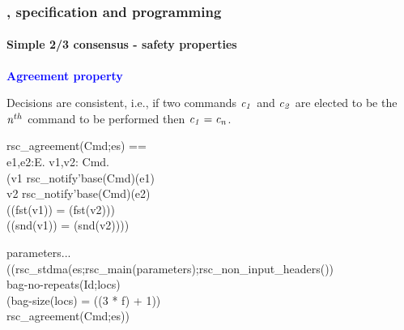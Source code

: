 \documentclass[12pt,red]{beamer}
\newcommand{\cemph}[1]{\textcolor{blue}{\textbf{#1}}}
\begin{document}
\begin{frame}[fragile]
  \frametitle{\eml, specification and programming}

  \framesubtitle{Simple 2/3 consensus - safety properties}

  \cemph{Agreement property}

  \vspace{0.1in}

  Decisions are consistent, i.e., if two commands $\mathit{c_1}$ and
  $\mathit{c_2}$ are elected to be the $\mathit{n}^{th}$ command to be
  performed then $\mathit{c_1}=\mathit{c_n}$.

  \begin{scriptsize}
    \begin{program*}
      \>rsc\_agreement(Cmd;es) ==\\
      \>  \mforall{}e1,e2:E. \mforall{}v1,v2:\mBbbZ{} \mtimes{} Cmd.\\
      \>    (v1 \mmember{} rsc\_notify'base(Cmd)(e1)\\
      \>    {}\mRightarrow{} v2 \mmember{} rsc\_notify'base(Cmd)(e2)\\
      \>    {}\mRightarrow{} ((fst(v1)) = (fst(v2)))\\
      \>    {}\mRightarrow{} ((snd(v1)) = (snd(v2))))
    \end{program*}
  \begin{scriptsize}

  \end{scriptsize}
    \begin{program*}
      \>\mforall{}parameters...\\
      \>  ((rsc\_stdma(es;rsc\_main(parameters);rsc\_non\_input\_headers())\\
      \>  {}\mRightarrow{} bag-no-repeats(Id;locs)\\
      \>  {}\mRightarrow{} (bag-size(locs) = ((3 * f) + 1))\\
      \>  {}\mRightarrow{} rsc\_agreement(Cmd;es))
    \end{program*}
  \end{scriptsize}
\end{frame}
\end{document}
